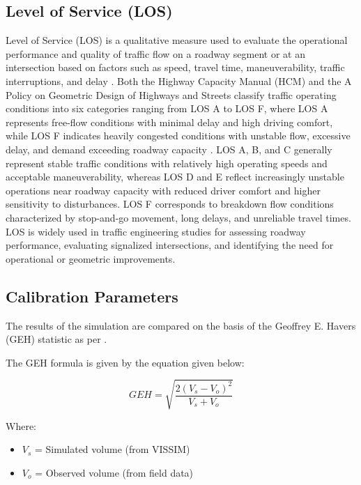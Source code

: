 \subsection{Level of Service (LOS)}
Level of Service (LOS) is a qualitative measure used to evaluate the 
operational performance and quality of traffic flow on a roadway 
segment or at an intersection based on factors such as speed, travel 
time, maneuverability, traffic interruptions, and delay 
\cite{trb2022hcm}. Both the Highway Capacity 
Manual (HCM) and the A Policy on Geometric Design of Highways and 
Streets classify traffic operating conditions into six categories 
ranging from LOS A to LOS F, where LOS A represents free-flow 
conditions with minimal delay and high driving comfort, while LOS F 
indicates heavily congested conditions with unstable flow, excessive 
delay, and demand exceeding roadway capacity \cite{aashto2018geometric}. LOS A, 
B, and C generally represent stable traffic conditions with 
relatively high operating speeds and acceptable maneuverability, 
whereas LOS D and E reflect increasingly unstable operations near 
roadway capacity with reduced driver comfort and higher sensitivity 
to disturbances. LOS F corresponds to breakdown flow conditions 
characterized by stop-and-go movement, long delays, and unreliable 
travel times. LOS is widely used in traffic engineering studies for 
assessing roadway performance, evaluating signalized intersections, 
and identifying the need for operational or geometric improvements.




\subsection{Calibration Parameters}

The results of the simulation are compared on the basis of the Geoffrey E. Havers (GEH) statistic as per \cite{analysis_procedures_manual}. 

The GEH formula is given by the equation given below:


 \begin{equation}
     GEH = \sqrt{\frac{2(V_s - V_o)^2}{V_s + V_o}}
 \end{equation}

 Where:
 \begin{itemize}
     \item $V_s$ = Simulated volume (from VISSIM)
     \item $V_o$ = Observed volume (from field data)
 \end{itemize}

